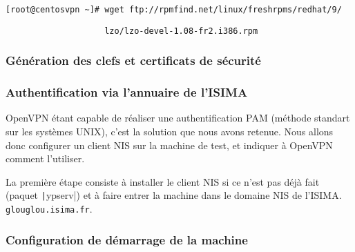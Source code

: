 \verb|[root@centosvpn ~]# wget ftp://rpmfind.net/linux/freshrpms/redhat/9/|

\verb|                    lzo/lzo-devel-1.08-fr2.i386.rpm|



\subsubsection{Génération des clefs et certificats de sécurité}


\subsubsection{Authentification via l'annuaire de l'ISIMA}

OpenVPN étant capable de réaliser une authentification PAM (méthode standart sur les systèmes UNIX), c'est la solution que nous avons retenue. Nous allons donc configurer un client NIS sur la machine de test, et indiquer à OpenVPN comment l'utiliser.

La première étape consiste à installer le client NIS si ce n'est pas déjà fait (paquet \texttt|ypserv|) et à faire entrer la machine dans le domaine NIS de l'ISIMA. \texttt{glouglou.isima.fr}.

\subsubsection{Configuration de démarrage de la machine}


\pagebreak


% 
